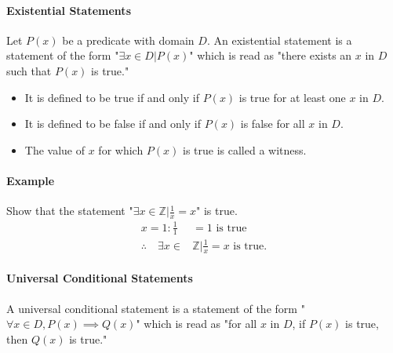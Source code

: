 \pagebreak

\paragraph*{Existential Statements}
Let $P(x)$ be a predicate with domain $D$. An existential statement is a statement of the form
"$\exists x \in D | P(x)$" which is read as "there exists an $x$ in $D$ such that $P(x)$ is true."
\begin{itemize}
    \item It is defined to be true if and only if $P(x)$ is true for at least one $x$ in $D$.
    \item It is defined to be false if and only if $P(x)$ is false for all $x$ in $D$.
    \item The value of $x$ for which $P(x)$ is true is called a witness.
\end{itemize}

\paragraph*{Example}
Show that the statement "$\exists x \in \mathbb{Z} | \frac{1}{x} = x$" is true.
\begin{align*}
    x = 1: \frac{1}{1} &= 1 \text{ is true}\\
    \therefore \quad \exists x \in &\mathbb{Z} | \frac{1}{x} = x \text{ is true.}
\end{align*}

\paragraph*{Universal Conditional Statements}
A universal conditional statement is a statement of the form "$\forall x \in D, P(x) \implies Q(x)$" 
which is read as "for all $x$ in $D$, if $P(x)$ is true, then $Q(x)$ is true."


